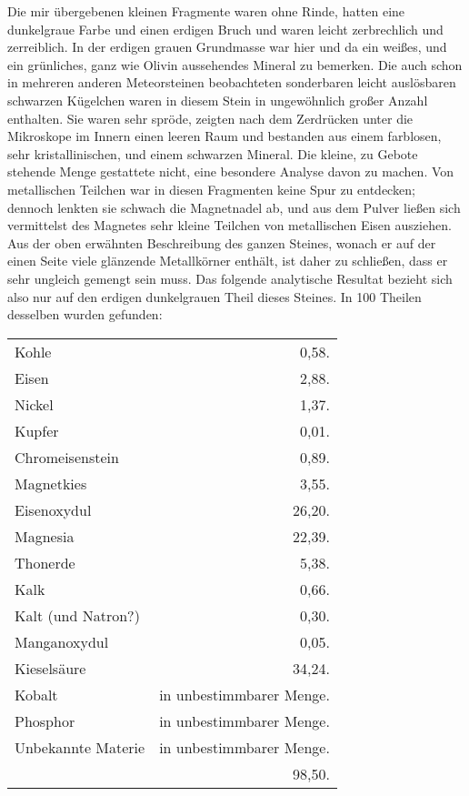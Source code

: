 \documentclass[a4paper, 11pt, oneside]{article}
\begin{document}
Die mir übergebenen kleinen Fragmente waren ohne Rinde, hatten eine dunkelgraue Farbe und einen erdigen Bruch und waren leicht zerbrechlich und zerreiblich. In der erdigen grauen Grundmasse war hier und da ein weißes, und ein grünliches, ganz wie Olivin aussehendes Mineral zu bemerken. Die auch schon in mehreren anderen Meteorsteinen beobachteten sonderbaren leicht auslösbaren schwarzen Kügelchen waren in diesem Stein in ungewöhnlich großer Anzahl enthalten. Sie waren sehr spröde, zeigten nach dem Zerdrücken unter die Mikroskope im Innern einen leeren Raum und bestanden aus einem farblosen, sehr kristallinischen, und einem schwarzen Mineral. Die kleine, zu Gebote stehende Menge gestattete nicht, eine besondere Analyse davon zu machen. Von metallischen Teilchen war in diesen Fragmenten keine Spur zu entdecken; dennoch lenkten sie schwach die Magnetnadel ab, und aus dem Pulver ließen sich vermittelst des Magnetes sehr kleine Teilchen von metallischen Eisen ausziehen. Aus der oben erwähnten Beschreibung des ganzen Steines, wonach er auf der einen Seite viele glänzende Metallkörner enthält, ist daher zu schließen, dass er sehr ungleich gemengt sein muss. Das folgende analytische Resultat bezieht sich also nur auf den erdigen dunkelgrauen Theil dieses Steines. In 100 Theilen desselben wurden gefunden:
\begin{center}
    \begin{tabular}{ l r } 
    Kohle & 0,58.\\
    Eisen & 2,88.\\
    Nickel & 1,37.\\
    Kupfer & 0,01.\\
    Chromeisenstein & 0,89.\\
    Magnetkies & 3,55.\\
    Eisenoxydul & 26,20.\\
    Magnesia & 22,39.\\
    Thonerde & 5,38.\\
    Kalk & 0,66.\\
    Kalt (und Natron?) & 0,30.\\
    Manganoxydul & 0,05.\\
    Kieselsäure & 34,24.\\
    Kobalt & in unbestimmbarer Menge.\\
    Phosphor & in unbestimmbarer Menge.\\
    Unbekannte Materie & in unbestimmbarer Menge.\\
     & 98,50.\\
    \end{tabular}
\end{center}
\end{document}
